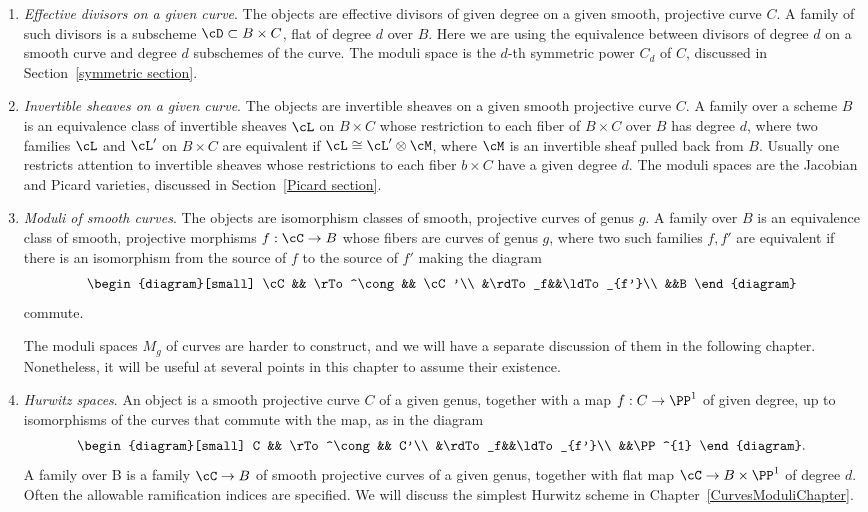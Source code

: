 \begin{enumerate}\label{list of moduli problems}

\item \emph{Effective divisors on a given curve}. The objects are effective divisors of given degree on a given smooth, projective curve $C$. A family of such divisors is a subscheme $\cD \subset B \times C$, flat of degree $d$ over $B$. 
Here we are using
the equivalence between divisors of degree $d$ on a smooth curve and degree $d$ subschemes of the curve. The moduli space is the $d$-th symmetric power $C_d$ of $C$, discussed in Section~\ref{symmetric section}.

\item \emph{Invertible sheaves on a given curve}. The objects are invertible sheaves on a given smooth projective curve $C$. A family over a scheme $B$ is an equivalence class of invertible sheaves $\cL$ on $B \times C$ whose restriction to each fiber of $B \times C$ over $B$ has degree $d$, where two families $\cL$ and $\cL'$ on $B \times C$ are equivalent if $\cL\cong \cL' \otimes \cM$, where $\cM$ is  an invertible sheaf pulled back from $B$. Usually one restricts attention to invertible sheaves 
whose restrictions to each fiber $b\times C$ have a given degree $d$.
The moduli spaces are the Jacobian and Picard varieties, discussed in Section~\ref{Picard section}.

\item \emph{Moduli of smooth curves}. The objects are isomorphism classes of smooth, projective curves of genus $g$. A family over $B$ is an equivalence class of smooth, projective morphisms $f : \cC \to B$ whose fibers are curves of genus $g$, where two such families $f, f'$
are equivalent if there is an isomorphism from the source of $f$ to the source
of $f'$ making the diagram
$$
\begin{diagram}[small]
\cC && \rTo^\cong && \cC'\\
&\rdTo_f&&\ldTo_{f'}\\
&&B
\end{diagram}
$$
commute.


The moduli spaces $M_g$ of curves are harder to construct, and we will have a separate discussion of them in the following chapter. Nonetheless, it will be useful at several points in this chapter to assume their existence.

\item \emph{Hurwitz spaces}. An object is a smooth projective curve $C$ of a given genus, together with a map $f: C\to \PP^1$ of given degree, up to isomorphisms of the curves that commute with the map, as in the diagram
$$
\begin{diagram}[small]
C && \rTo^\cong && C'\\
&\rdTo_f&&\ldTo_{f'}\\
&&\PP^{1}
\end{diagram}.
$$
A family over B is a family $\cC \to B$ of smooth projective curves  of a given genus, together with flat map $\cC \to B\times \PP^{1}$ of degree $d$.
 Often the allowable ramification indices are specified. We will discuss the simplest Hurwitz scheme in Chapter~\ref{CurvesModuliChapter}.


\end{enumerate}
